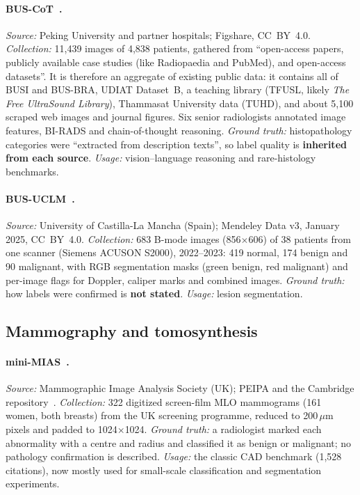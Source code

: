 \documentclass[11pt]{article}
\begin{document}
\paragraph{BUS-CoT~\citep{yu2025buscot}.}
\emph{Source:} Peking University and partner hospitals; Figshare, CC~BY~4.0.
\emph{Collection:} 11,439 images of 4,838 patients, gathered from
``open-access papers, publicly available case studies (like Radiopaedia and
PubMed), and open-access datasets''. It is therefore an aggregate of existing
public data: it contains all of BUSI and BUS-BRA, UDIAT Dataset~B, a teaching
library (TFUSL, likely \emph{The Free UltraSound Library}), Thammasat
University data (TUHD), and about 5,100 scraped web images and journal
figures. Six senior radiologists annotated image features, BI-RADS and
chain-of-thought reasoning. \emph{Ground truth:} histopathology categories were
``extracted from description texts'', so label quality is \textbf{inherited
from each source}. \emph{Usage:} vision--language reasoning and
rare-histology benchmarks.

\paragraph{BUS-UCLM~\citep{busuclm2025mendeley}.}
\emph{Source:} University of Castilla-La Mancha (Spain); Mendeley Data v3,
January 2025, CC~BY~4.0. \emph{Collection:} 683 B-mode images (856$\times$606)
of 38 patients from one scanner (Siemens ACUSON S2000), 2022--2023: 419
normal, 174 benign and 90 malignant, with RGB segmentation masks (green
benign, red malignant) and per-image flags for Doppler, caliper marks and
combined images. \emph{Ground truth:} how labels were confirmed is
\textbf{not stated}. \emph{Usage:} lesion segmentation.

\subsection{Mammography and tomosynthesis}

\paragraph{mini-MIAS~\citep{suckling1994mias}.}
\emph{Source:} Mammographic Image Analysis Society (UK); PEIPA and the
Cambridge repository~\citep{suckling2015miasv121}. \emph{Collection:} 322
digitized screen-film MLO mammograms (161 women, both breasts) from the UK
screening programme, reduced to 200\,$\mu$m pixels and padded to
1024$\times$1024. \emph{Ground truth:} a radiologist marked each abnormality
with a centre and radius and classified it as benign or malignant; no
pathology confirmation is described. \emph{Usage:} the classic CAD benchmark
(1,528 citations), now mostly used for small-scale classification and
segmentation experiments.
\end{document}

